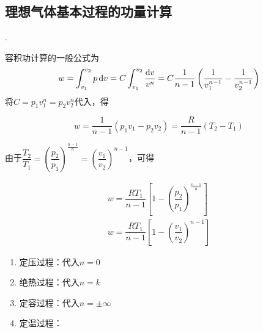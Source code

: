 \subsection{理想气体基本过程的功量计算}
. \dya[容积功]
\par 容积功计算的一般公式为
\begin{equation}
	w = \int_{v_1}^{v_2}p\,{\rm{d}} v = C \int_{v_1}^{v_2} \dfrac{{\rm{d}} v}{v^n}= C \dfrac{1}{n-1}\left(\dfrac{1}{v_1^{n-1}}- \dfrac{1}{v_2^{n-1}}\right)
\end{equation}
将$C = p_1v_1^n = p_2 v_2^n$代入，得
\begin{itemizea}
	\item 
	\begin{equation}
		w = \dfrac{1}{n - 1}(p_1v_1 - p_2v_2) = \dfrac{R}{n - 1}(T_2 - T_1)
	\end{equation}
\end{itemizea}
由于$\dfrac{T_2}{T_1}=\left(\dfrac{p_2}{p_1}\right)^{\textstyle \frac{n - 1}{n}} = \left(\dfrac{v_1}{v_2}\right)^{n-1}$，可得
\begin{itemizea}
	\item 
	\begin{align}
		w = \dfrac{R T_1}{n-1}\left[1-\left(\dfrac{p_2}{p_1}\right)^{\textstyle \frac{n - 1}{n}}\right]\\[1em]
		w = \dfrac{R T_1}{n-1}\left[1-\left(\dfrac{v_1}{v_2}\right)^{n-1}\right]
	\end{align}
\end{itemizea}
\begin{enumerate}[(1) ]
	\item 定压过程：代入$n=0$
	\item 绝热过程：代入$n=k$
	\item 定容过程：代入$n = \pm \infty$
	\item 定温过程：
\end{enumerate}


